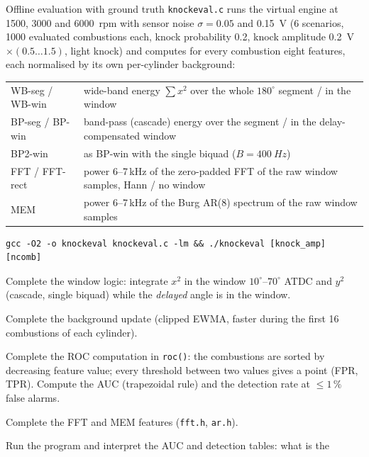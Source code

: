 \begin{exercise}{Offline evaluation with ground truth}{\JSLinux}
\sloppy
\texttt{knockeval.c} runs the virtual engine at 1500, 3000 and \SI{6000}{rpm} with sensor
noise $\sigma=0.05$ and \SI{0.15}{V} (6 scenarios, 1000 evaluated combustions each, knock
probability 0.2, knock amplitude \SI{0.2}{V}$\times(0.5\dots1.5)$, light knock) and computes
for every combustion eight features, each normalised by its own per-cylinder background:
\begin{center}
\small
\begin{tabularx}{\textwidth}{@{}lX@{}}
\toprule
WB-seg / WB-win & wide-band energy $\sum x^2$ over the whole $180^\circ$ segment / in the window\\
BP-seg / BP-win & band-pass (cascade) energy over the segment / in the delay-compensated window\\
BP2-win & as BP-win with the single biquad ($B=\SI{400}{Hz}$)\\
FFT / FFT-rect & power 6--7\,kHz of the zero-padded FFT of the raw window samples, Hann / no window\\
MEM & power 6--7\,kHz of the Burg AR(8) spectrum of the raw window samples\\
\bottomrule
\end{tabularx}
\end{center}
\begin{lstlisting}[style=shell]
gcc -O2 -o knockeval knockeval.c -lm && ./knockeval [knock_amp] [ncomb]
\end{lstlisting}
\begin{tasks}
  \item Complete the window logic: integrate $x^2$ in the window $10^\circ$--$70^\circ$
    ATDC and $y^2$ (cascade, single biquad) while the \emph{delayed} angle is in the
    window.
  \item Complete the background update (clipped EWMA, faster during the first 16
    combustions of each cylinder).
  \item Complete the ROC computation in \texttt{roc()}: the combustions are sorted by
    decreasing feature value; every threshold between two values gives a point
    (FPR, TPR). Compute the AUC (trapezoidal rule) and the detection rate at
    $\le1\,\%$ false alarms.
  \item Complete the FFT and MEM features (\texttt{fft.h}, \texttt{ar.h}).
  \item Run the program and interpret the AUC and detection tables: what is the

\end{tasks}
\end{exercise}
